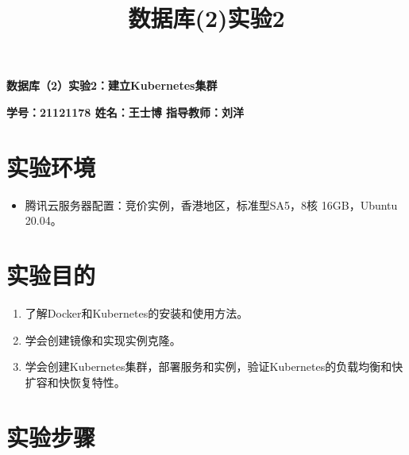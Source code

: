 \documentclass{article}
\title{\Huge 数据库(2)实验2}
\author{}
\begin{document}
\begin{center}
    \textbf{\huge 数据库（2）实验2：建立Kubernetes集群}
\end{center}
\begin{center}
    \textbf{\large \textbf{学号：21121178 \quad 姓名：王士博 \quad 指导教师：刘洋}}
\end{center}
\hrulefill
\section{实验环境}
\begin{itemize}
    \item 腾讯云服务器配置：竞价实例，香港地区，标准型SA5，8核 16GB，Ubuntu 20.04。
\end{itemize}
\section{实验目的}
\begin{enumerate}
    \item 了解Docker和Kubernetes的安装和使用方法。
    \item 学会创建镜像和实现实例克隆。
    \item 学会创建Kubernetes集群，部署服务和实例，验证Kubernetes的负载均衡和快扩容和快恢复特性。
\end{enumerate}
\section{实验步骤}
\end{document}

